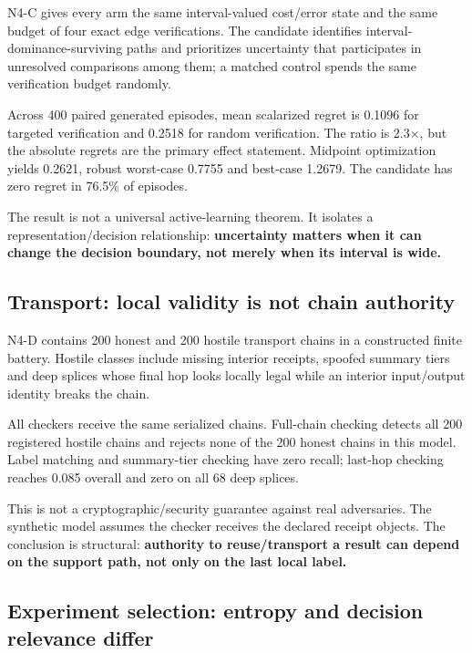 \documentclass[10pt]{article}
\begin{document}
N4-C gives every arm the same interval-valued cost/error state and the
same budget of four exact edge verifications. The candidate identifies
interval-dominance-surviving paths and prioritizes uncertainty that
participates in unresolved comparisons among them; a matched control
spends the same verification budget randomly.

Across 400 paired generated episodes, mean scalarized regret is 0.1096
for targeted verification and 0.2518 for random verification. The ratio
is 2.3×, but the absolute regrets are the primary effect statement.
Midpoint optimization yields 0.2621, robust worst-case 0.7755 and
best-case 1.2679. The candidate has zero regret in 76.5\% of episodes.

The result is not a universal active-learning theorem. It isolates a
representation/decision relationship: \textbf{uncertainty matters when
it can change the decision boundary, not merely when its interval is
wide.}

\hypertarget{transport-local-validity-is-not-chain-authority}{%
\subsection{Transport: local validity is not chain
authority}\label{transport-local-validity-is-not-chain-authority}}

N4-D contains 200 honest and 200 hostile transport chains in a
constructed finite battery. Hostile classes include missing interior
receipts, spoofed summary tiers and deep splices whose final hop looks
locally legal while an interior input/output identity breaks the chain.

All checkers receive the same serialized chains. Full-chain checking
detects all 200 registered hostile chains and rejects none of the 200
honest chains in this model. Label matching and summary-tier checking
have zero recall; last-hop checking reaches 0.085 overall and zero on
all 68 deep splices.

This is not a cryptographic/security guarantee against real adversaries.
The synthetic model assumes the checker receives the declared receipt
objects. The conclusion is structural: \textbf{authority to
reuse/transport a result can depend on the support path, not only on the
last local label.}

\hypertarget{experiment-selection-entropy-and-decision-relevance-differ}{%
\subsection{Experiment selection: entropy and decision relevance
differ}\label{experiment-selection-entropy-and-decision-relevance-differ}}
\end{document}
